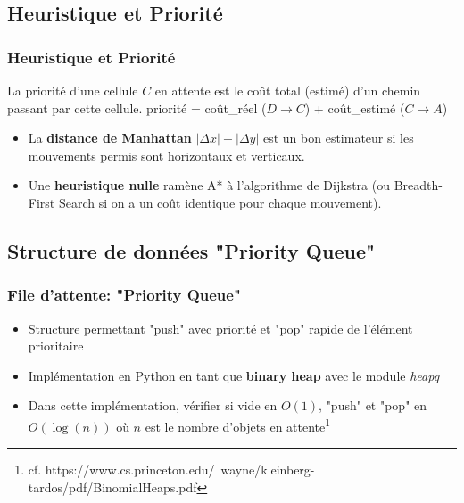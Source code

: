 \documentclass[]{beamer}
\begin{document}
\subsection{Heuristique et Priorité}
\begin{frame}
  \frametitle{Heuristique et Priorité}
  La priorité d'une cellule $C$ en attente est le coût total (estimé) d'un chemin passant par cette cellule.
  \smallskip
  priorité = coût\_réel ($D \rightarrow C$) + coût\_estimé ($C\rightarrow A$)


  \medskip
  \begin{itemize}
  \item<3->{La \textbf{distance de Manhattan} $|\Delta x| + |\Delta y|$ est un bon estimateur 
  si les mouvements permis sont horizontaux et verticaux.}
  \par
  \item<4->{Une \textbf{heuristique nulle} ramène A* à l'algorithme de Dijkstra 
  (ou Breadth-First Search si on a un coût identique pour chaque mouvement).}
  \end{itemize}
\end{frame}

\subsection{Structure de données "Priority Queue"}
\begin{frame}
  \frametitle{File d'attente: "Priority Queue"}
  \begin{itemize}
  \item Structure permettant "push" avec priorité et "pop" rapide de
    l'élément prioritaire
  \item Implémentation en Python en tant que \textbf{binary heap} avec le module \textit{heapq}
  \item Dans cette implémentation, vérifier si vide en $O(1)$, "push" et
    "pop" en $O\left(\log(n)\right)$ où $n$ est le nombre d'objets en attente\footnote{cf. https://www.cs.princeton.edu/~wayne/kleinberg-tardos/pdf/BinomialHeaps.pdf}
  \end{itemize}
\end{frame}
\end{document}
